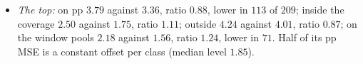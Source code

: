 \documentclass[11pt]{article}
\begin{document}
\begin{itemize}
    coverage $0.73$ against $1.10$, ratio $0.66$; outside $0.99$ against $6.05$, ratio $0.20$; on the window pools
    $2.03$ against $1.03$, ratio $1.94$, lower in $22$.
  \item \emph{The top:} on pp $3.79$ against $3.36$, ratio $0.88$, lower in $113$ of $209$; inside the coverage $2.50$
    against $1.75$, ratio $1.11$; outside $4.24$ against $4.01$, ratio $0.87$; on the window pools $2.18$ against
    $1.56$, ratio $1.24$, lower in $71$. Half of its pp MSE is a constant offset per class (median level $1.85$).
\end{itemize}
\end{document}
